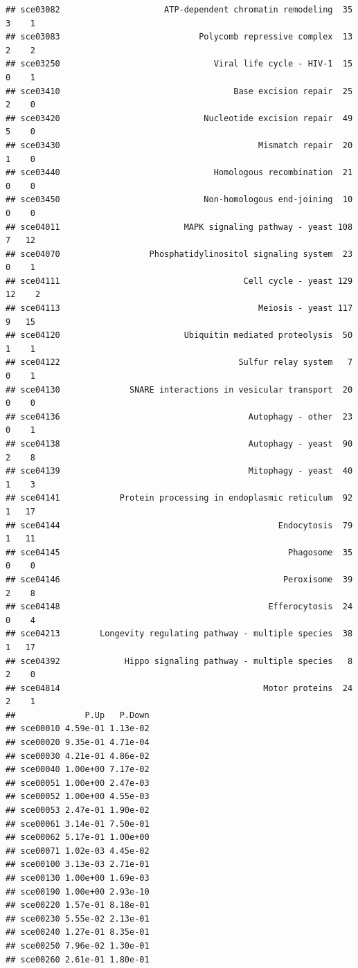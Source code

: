 \documentclass[
]{book}
\begin{document}
\begin{verbatim}
## sce03082                     ATP-dependent chromatin remodeling  35  3    1
## sce03083                            Polycomb repressive complex  13  2    2
## sce03250                               Viral life cycle - HIV-1  15  0    1
## sce03410                                   Base excision repair  25  2    0
## sce03420                             Nucleotide excision repair  49  5    0
## sce03430                                        Mismatch repair  20  1    0
## sce03440                               Homologous recombination  21  0    0
## sce03450                             Non-homologous end-joining  10  0    0
## sce04011                         MAPK signaling pathway - yeast 108  7   12
## sce04070                  Phosphatidylinositol signaling system  23  0    1
## sce04111                                     Cell cycle - yeast 129 12    2
## sce04113                                        Meiosis - yeast 117  9   15
## sce04120                         Ubiquitin mediated proteolysis  50  1    1
## sce04122                                    Sulfur relay system   7  0    1
## sce04130              SNARE interactions in vesicular transport  20  0    0
## sce04136                                      Autophagy - other  23  0    1
## sce04138                                      Autophagy - yeast  90  2    8
## sce04139                                      Mitophagy - yeast  40  1    3
## sce04141            Protein processing in endoplasmic reticulum  92  1   17
## sce04144                                            Endocytosis  79  1   11
## sce04145                                              Phagosome  35  0    0
## sce04146                                             Peroxisome  39  2    8
## sce04148                                          Efferocytosis  24  0    4
## sce04213        Longevity regulating pathway - multiple species  38  1   17
## sce04392             Hippo signaling pathway - multiple species   8  2    0
## sce04814                                         Motor proteins  24  2    1
##              P.Up   P.Down
## sce00010 4.59e-01 1.13e-02
## sce00020 9.35e-01 4.71e-04
## sce00030 4.21e-01 4.86e-02
## sce00040 1.00e+00 7.17e-02
## sce00051 1.00e+00 2.47e-03
## sce00052 1.00e+00 4.55e-03
## sce00053 2.47e-01 1.90e-02
## sce00061 3.14e-01 7.50e-01
## sce00062 5.17e-01 1.00e+00
## sce00071 1.02e-03 4.45e-02
## sce00100 3.13e-03 2.71e-01
## sce00130 1.00e+00 1.69e-03
## sce00190 1.00e+00 2.93e-10
## sce00220 1.57e-01 8.18e-01
## sce00230 5.55e-02 2.13e-01
## sce00240 1.27e-01 8.35e-01
## sce00250 7.96e-02 1.30e-01
## sce00260 2.61e-01 1.80e-01

\end{verbatim}
\end{document}
